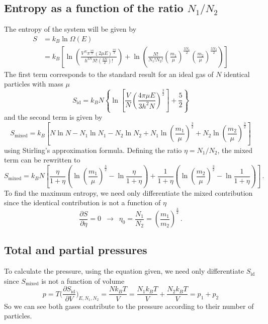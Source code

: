 \newpage
\subsection{Entropy as a function of the ratio $N_1/N_2$}
    The entropy of the system will be given by
    \begin{align}
        S &= k_B \ln \Omega(E) \\
        &= k_B \left[\ln\left( \frac{V^N \pi^{\frac{3N}{2}} (2\mu E)^{\frac{3N}{2}}}{h^{3N}N!\left(\frac{3N}{2}\right)!} \right)
         + \ln\left( \frac{N!}{N_1!N_2!}\left( \frac{m_1}{\mu} \right)^{\frac{3N_1}{2}}\left( \frac{m_2}{\mu} \right)^{\frac{3N_2}{2}} \right)\right]
    \end{align}
    The first term corresponds to the standard result for an ideal gas of $N$ identical particles with mass $\mu$
    \begin{equation}
    S_{\text{id}} = k_B N \left\{ \ln\left[ \frac{V}{N} \left( \frac{4\pi\mu E}{3h^2N} \right)^{\frac{3}{2}}  \right] + \frac{5}{2} \right\} 
    \end{equation}
    and the second term is given by
    \begin{equation}
    S_{\text{mixed}} = k_B \left[ N\ln N - N_1\ln N_1 - N_2\ln N_2 + N_1 \ln\left(\frac{m_1}{\mu}\right)^{\frac{3}{2}} + N_2 \ln\left(\frac{m_2}{\mu}\right)^{\frac{3}{2}} \right]
    \end{equation}
    using Stirling's approximation formula. Defining the ratio $\eta = N_1/N_2$, the mixed term can be rewritten to
    \begin{equation}
    S_{\text{mixed}} = k_B N \left[ \frac{\eta}{1+\eta}\left( \ln\left( \frac{m_1}{\mu} \right)^{\frac{3}{2}} - \ln\frac{\eta}{1+\eta}\right) 
    + \frac{1}{1+\eta}\left( \ln\left( \frac{m_2}{\mu} \right)^{\frac{3}{2}} - \ln\frac{1}{1+\eta}\right) \right] \,.
    \end{equation}
    To find the maximum entropy, we need only differentiate the mixed contribution since the identical contribution is not a function of $\eta$
    \begin{equation}
    \frac{\partial S}{\partial \eta} = 0 \, \, \,  \longrightarrow  \, \, \,  \eta_0 = \frac{N_1}{N_2} = \left(\frac{m_1}{m_2}\right)^{\frac{3}{2}} \,.
    \end{equation}
    
    
\subsection{Total and partial pressures}
    To calculate the pressure, using the equation given, we need only differentiate $S_{\text{id}}$ since $S_{\text{mixed}}$ is not a function of volume
    \begin{equation}
        p=T\bigg(\frac{\partial S_{\text{id}}}{\partial V}\bigg)_{E,N_1,N_2} = \frac{N k_B T}{V} = \frac{N_1 k_B T}{V} + \frac{N_2 k_B T}{V} = p_1 + p_2
    \end{equation}
    So we can see both gases contribute to the pressure according to their number of particles.

